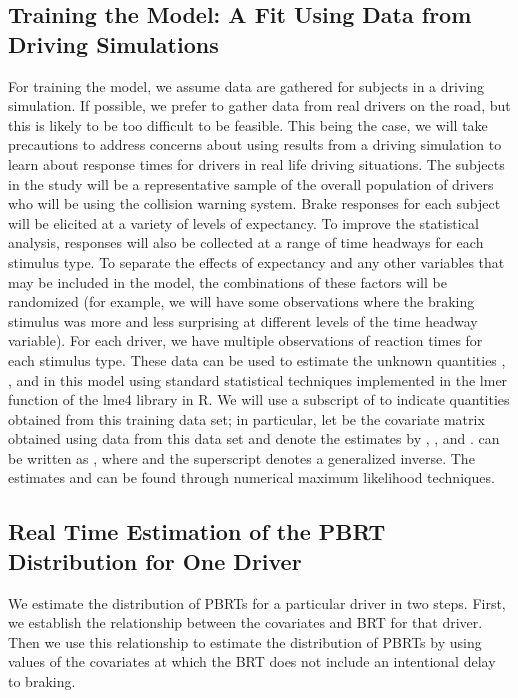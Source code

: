 \documentclass[conference]{IEEEtran}
\begin{document}
\subsection{Training the Model: A Fit Using Data from Driving Simulations}
For training the model, we assume data are gathered for  subjects in a driving simulation.  If possible, we prefer to gather data from real drivers on the road, but this is likely to be too difficult to be feasible.  This being the case, we will take precautions to address concerns about using results from a driving simulation to learn about response times for drivers in real life driving situations. The subjects in the study will be a representative sample of the overall population of drivers who will be using the collision warning system.  Brake responses for each subject will be elicited at a variety of levels of expectancy.  To improve the statistical analysis, responses will also be collected at a range of time headways for each stimulus type.  To separate the effects of expectancy and any other variables that may be included in the model, the combinations of these factors will be randomized (for example, we will have some observations where the braking stimulus was more and less surprising at different levels of the time headway variable).
For each driver, we have multiple observations of reaction times for each stimulus type.  These data can be used to estimate the unknown quantities , , and  in this model using standard statistical techniques implemented in the lmer function of the lme4 library in R.  We will use a subscript of  to indicate quantities obtained from this training data set; in particular, let  be the covariate matrix obtained using data from this data set and denote the estimates by , , and .   can be written as , where  and the superscript  denotes a generalized inverse.  The estimates  and  can be found through numerical maximum likelihood techniques.
\subsection{Real Time Estimation of the PBRT Distribution for One Driver}
\label{subsubsec:FreqRealTimeReactionDistEst}
We estimate the distribution of PBRTs for a particular driver in two steps.  First, we establish the relationship between the covariates and BRT for that driver.  Then we use this relationship to estimate the distribution of PBRTs by using values of the covariates at which the BRT does not include an intentional delay to braking.
\end{document}
